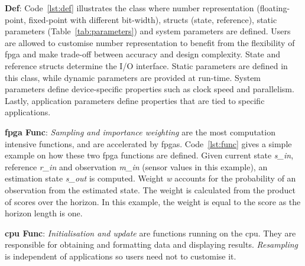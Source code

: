 \textbf{Def}: Code~\ref{lst:def} illustrates the class where number representation (floating-point, fixed-point with different bit-width), structs (state, reference), static parameters (Table~\ref{tab:parameters}) and system parameters are defined.
Users are allowed to customise number representation to benefit from the flexibility of \gls{fpga} and make trade-off between accuracy and design complexity.
State and reference structs determine the I/O interface.
Static parameters are defined in this class, while dynamic parameters are provided at run-time.
System parameters define device-specific properties such as clock speed and parallelism.
Lastly, application parameters define properties that are tied to specific applications.

\textbf{\gls{fpga} Func}: \textit{Sampling and importance weighting} are the most computation intensive functions, and are accelerated by \glspl{fpga}.
Code~\ref{lst:func} gives a simple example on how these two \gls{fpga} functions are defined.
Given current state \textit{s\_in}, reference \textit{r\_in} and observation \textit{m\_in} (sensor values in this example), an estimation state \textit{s\_out} is computed.
Weight \textit{w} accounts for the probability of an observation from the estimated state.
The weight is calculated from the product of scores over the horizon.
In this example, the weight is equal to the score as the horizon length is one. 

\textbf{\gls{cpu} Func}: \textit{Initialisation and update} are functions running on the \gls{cpu}.
They are responsible for obtaining and formatting data and displaying results.
\textit{Resampling} is independent of applications so users need not to customise it.

